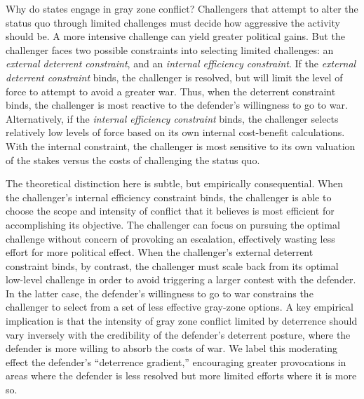\documentclass[bibtex, autowc]{apsr_submission}
\begin{document}
Why do states engage in gray zone conflict? Challengers that attempt to alter the status quo through limited challenges must decide how aggressive the activity should be. A more intensive challenge can yield greater political gains. But the challenger faces two possible constraints into selecting limited challenges: an \textit{external deterrent constraint}, and an \textit{internal efficiency constraint}. If the \textit{external deterrent constraint} binds, the challenger is resolved, but will limit the level of force to attempt to avoid a greater war. Thus, when the deterrent constraint binds, the challenger is most reactive to the defender's willingness to go to war. Alternatively, if the \textit{internal efficiency constraint} binds, the challenger selects relatively low levels of force based on its own internal cost-benefit calculations. With the internal constraint, the challenger is most sensitive to its own valuation of the stakes versus the costs of challenging the status quo. 
 
The theoretical distinction here is subtle, but empirically consequential. When the challenger's internal efficiency constraint binds, the challenger is able to choose the scope and intensity of conflict that it believes is most efficient for accomplishing its objective. The challenger can focus on pursuing the optimal challenge without concern of provoking an escalation, effectively wasting less effort for more political effect. When the challenger's external deterrent constraint binds, by contrast, the challenger must scale back from its optimal low-level challenge in order to avoid triggering a larger contest with the defender. In the latter case, the defender's willingness to go to war constrains the challenger to select from a set of less effective gray-zone options. A key empirical implication is that the intensity of gray zone conflict limited by deterrence should vary inversely with the credibility of the defender's deterrent posture, where the defender is more willing to absorb the costs of war. We label this moderating effect the defender's ``deterrence gradient,'' encouraging greater provocations in areas where the defender is less resolved but more limited efforts where it is more so. 
\end{document}
